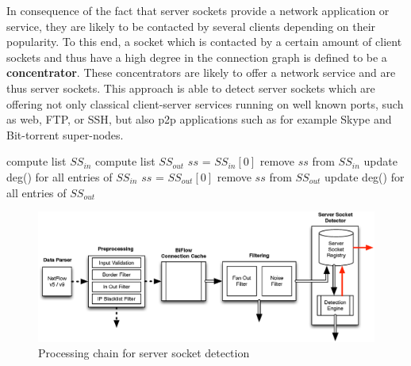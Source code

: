 In consequence of the fact that \glspl{server socket} provide a network
application or service, they are likely to be contacted by several clients
depending on their popularity. To this end, a socket which is contacted by a
certain amount of client sockets and thus have a high degree in the connection
graph is defined to be a \textbf{concentrator}. These concentrators are likely
to offer a network service and are thus \glspl{server socket}.
This approach is able to detect \glspl{server socket} which are offering not
only classical client-server services running on well known ports, such as web,
\gls{FTP}, or \gls{SSH}, but also \gls{p2p} applications such as for example
Skype and Bit-torrent super-nodes.


\begin{algorithm}[t!]
\caption{Detection of server sockets by \citet{Schatzmann:Mining,Schatzmann:Dissection, Schatzmann:Tracing}}
\label{alg:service_tracing_ss-detection}
\begin{algorithmic}
\STATE
\STATE compute list $SS_{in}$ 
\STATE compute list $SS_{out}$ 
\STATE
{}
        \STATE $ss$ = $SS_{in}[0]$ 
        \STATE remove $ss$ from $SS_{in}$
        \STATE update deg() for all entries of $SS_{in}$
    \ENDWHILE
        \STATE $ss$ = $SS_{out}[0]$ 
        \STATE remove $ss$ from $SS_{out}$
        \STATE update deg() for all entries of $SS_{out}$
    \ENDWHILE
\ENDWHILE
\end{algorithmic}
\end{algorithm}

\begin{figure}
	[ht] \centering
	\includegraphics[width=\linewidth]{images/Detection_chain.eps}
	\caption{Processing chain for server socket detection}
	\label{fig:detection_chain}
\end{figure}

